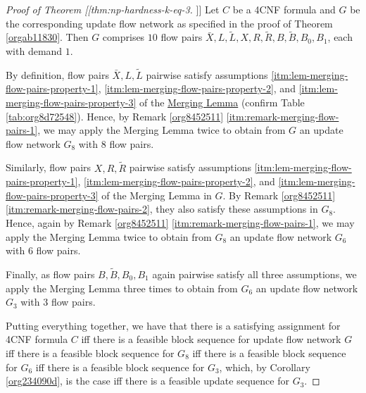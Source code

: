 \documentclass[fontsize=11pt,paper=a4]{book}
\begin{document}
\begin{proof}[Proof of Theorem [[thm:np-hardness-k-eq-3]]]
Let \(C\) be a 4CNF formula and \(G\) be the corresponding update flow network as specified in the proof of Theorem \ref{orgab11830}.
Then \(G\) comprises \(10\) flow pairs \(\bar{X},L,\tilde{L},X,R,\tilde{R},B,\tilde{B},B_0,B_1\), each with demand \(1\).

By definition, flow pairs \(\bar{X},L,\tilde{L}\) pairwise satisfy assumptions \ref{itm:lem-merging-flow-pairs-property-1}, \ref{itm:lem-merging-flow-pairs-property-2}, and \ref{itm:lem-merging-flow-pairs-property-3} of the \hyperref[org859ddb4]{Merging Lemma} (confirm Table \ref{tab:org8d72548}).
Hence, by Remark \ref{org8452511} \ref{itm:remark-merging-flow-pairs-1}, we may apply the Merging Lemma twice to obtain from \(G\) an update flow network \(G_8\) with \(8\) flow pairs.

Similarly, flow pairs \(X,R,\tilde{R}\) pairwise satisfy assumptions \ref{itm:lem-merging-flow-pairs-property-1}, \ref{itm:lem-merging-flow-pairs-property-2}, and \ref{itm:lem-merging-flow-pairs-property-3} of the Merging Lemma in \(G\).
By Remark \ref{org8452511} \ref{itm:remark-merging-flow-pairs-2}, they also satisfy these assumptions in \(G_8\).
Hence, again by Remark \ref{org8452511} \ref{itm:remark-merging-flow-pairs-1}, we may apply the Merging Lemma twice to obtain from \(G_8\) an update flow network \(G_6\) with \(6\) flow pairs.

Finally, as flow pairs \(B,\tilde{B},B_0,B_1\) again pairwise satisfy all three assumptions, we apply the Merging Lemma three times to obtain from \(G_6\) an update flow network \(G_3\) with \(3\) flow pairs.

Putting everything together, we have that there is a satisfying assignment for 4CNF formula \(C\) iff there is a feasible block sequence for update flow network \(G\) iff there is a feasible block sequence for \(G_8\) iff there is a feasible block sequence for \(G_6\) iff there is a feasible block sequence for \(G_3\), which, by Corollary \ref{org234090d}, is the case iff there is a feasible update sequence for \(G_3\).
\end{proof}
\end{document}

